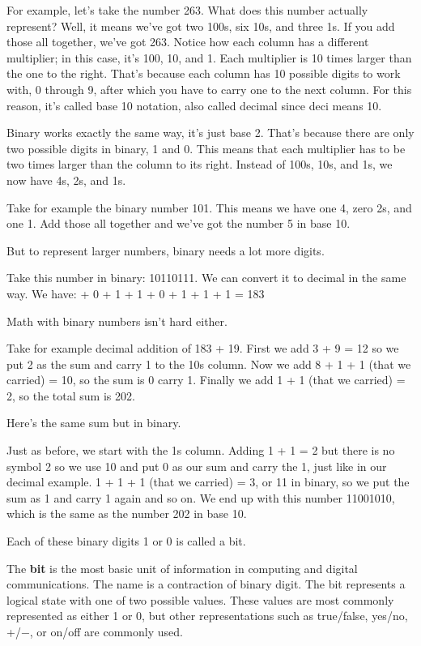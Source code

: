 \be
For example, let's take the number 263. What does this number actually represent? Well, it means we've got two 100s,
six 10s, and three 1s. If you add those all together, we've got 263. Notice how each column has a different
multiplier; in this case, it's 100, 10, and 1. Each multiplier is 10 times larger than the one to the right. That's
because each column has 10 possible digits to work with, 0 through 9, after which you have to carry one to the next
column. For this reason, it's called base 10 notation, also called decimal since deci means 10.
\ee

Binary works exactly the same way, it's just base 2. That's because there are only two possible digits in binary, 1
and 0. This means that each multiplier has to be two times larger than the column to its right. Instead of 100s, 10s,
and 1s, we now have 4s, 2s, and 1s.

\be
Take for example the binary number 101. This means we have one 4, zero 2s, and one 1. Add those all together and
we've got the number 5 in base 10.
\ee

But to represent larger numbers, binary needs a lot more digits.

\be
Take this number in binary: 10110111. We can convert it to decimal in the same way. We have:
 + 0 + 1 + 1 + 0 + 1 +
1 + 1 = 183
\ese
\ee

Math with binary numbers isn't hard either.

\be
Take for example decimal addition of 183 + 19. First we add 3 + 9 = 12 so we put 2 as the sum and carry 1 to the 10s
column. Now we add 8 + 1 + 1 (that we carried) = 10, so the sum is 0 carry 1. Finally we add 1 + 1 (that we carried)
= 2, so the total sum is 202.
\ee

Here's the same sum but in binary.

\be
Just as before, we start with the 1s column. Adding 1 + 1 = 2 but there is no symbol 2 so we use 10 and put 0 as our
sum and carry the 1, just like in our decimal example. 1 + 1 + 1 (that we carried) = 3, or 11 in binary, so we put
the sum as 1 and carry 1 again and so on. We end up with this number 11001010, which is the same as the number 202 in
base 10.
\ee

Each of these binary digits 1 or 0 is called a bit.

\bd[Bit]
The \textbf{bit} is the most basic unit of information in computing and digital communications. The name is a
contraction of binary digit. The bit represents a logical state with one of two possible values. These values are
most commonly represented as either 1 or 0, but other representations such as true/false, yes/no, +/−, or on/off are
commonly used.
\ed

